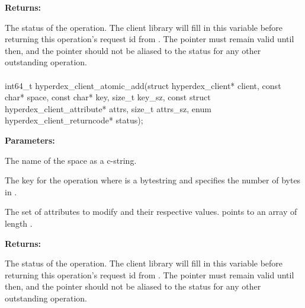 \noindent\textbf{Returns:}
\begin{description}[labelindent=\widthof{{\code{status}}},leftmargin=*,noitemsep,nolistsep,align=right]
\item[\code{status}] The status of the operation.  The client library will fill in this variable before returning this operation's request id from .  The pointer must remain valid until then, and the pointer should not be aliased to the status for any other outstanding operation.
\end{description}

\paragraph{}
\begin{ccode}
int64_t hyperdex_client_atomic_add(struct hyperdex_client* client,
                const char* space,
                const char* key, size_t key_sz,
                const struct hyperdex_client_attribute* attrs, size_t attrs_sz,
                enum hyperdex_client_returncode* status);
\end{ccode}
\funcdesc 

\noindent\textbf{Parameters:}
\begin{description}[labelindent=\widthof{{\code{attrs}, \code{attrs\_sz}}},leftmargin=*,noitemsep,nolistsep,align=right]
\item[\code{space}] The name of the space as a c-string.
\item[\code{key}, \code{key\_sz}] The key for the operation where  is a bytestring and  specifies the number of bytes in .
\item[\code{attrs}, \code{attrs\_sz}] The set of attributes to modify and their respective values.   points to an array of length .
\end{description}

\noindent\textbf{Returns:}
\begin{description}[labelindent=\widthof{{\code{status}}},leftmargin=*,noitemsep,nolistsep,align=right]
\item[\code{status}] The status of the operation.  The client library will fill in this variable before returning this operation's request id from .  The pointer must remain valid until then, and the pointer should not be aliased to the status for any other outstanding operation.
\end{description}

